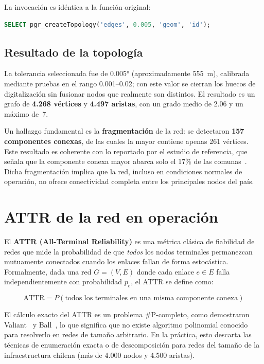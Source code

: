 \documentclass[12pt,a4paper]{article}
\begin{document}
La invocación es idéntica a la función original:

\begin{lstlisting}[language=SQL,caption={Invocación de pgr\_createTopology}]
SELECT pgr_createTopology('edges', 0.005, 'geom', 'id');
\end{lstlisting}

\subsection{Resultado de la topología}

La tolerancia seleccionada fue de 0.005° (aproximadamente 555~m),
calibrada mediante pruebas en el rango 0.001--0.02; con este valor se
cierran los huecos de digitalización sin fusionar nodos que realmente son
distintos.  El resultado es un grafo de \textbf{4.268 vértices} y
\textbf{4.497 aristas}, con un grado medio de 2.06 y un máximo de~7.

Un hallazgo fundamental es la \textbf{fragmentación} de la red: se
detectaron \textbf{157 componentes conexas}, de las cuales la mayor
contiene apenas 261 vértices.  Este resultado es coherente con lo reportado
por el estudio de referencia, que señala que la componente conexa mayor
abarca solo el 17\% de las comunas~\cite{niclabs2018}.  Dicha fragmentación
implica que la red, incluso en condiciones normales de operación, no ofrece
conectividad completa entre los principales nodos del país.


\section{ATTR de la red en operación}

El \textbf{ATTR (All-Terminal Reliability)} es una métrica clásica de
fiabilidad de redes que mide la probabilidad de que \textit{todos} los
nodos terminales permanezcan mutuamente conectados cuando los enlaces
fallan de forma estocástica.  Formalmente, dada una red $G=(V,E)$ donde
cada enlace $e \in E$ falla independientemente con probabilidad
$p_e$, el ATTR se define como:

\begin{equation}
\text{ATTR} = P\!\left(\text{todos los terminales en una misma componente conexa}\right)
\end{equation}

El cálculo exacto del ATTR es un problema \#P-completo, como demostraron
Valiant~\cite{valiant1979} y Ball~\cite{ball1986}, lo que significa que no
existe algoritmo polinomial conocido para resolverlo en redes de tamaño
arbitrario.  En la práctica, esto descarta las técnicas de enumeración
exacta o de descomposición para redes del tamaño de la infraestructura
chilena (más de 4.000 nodos y 4.500 aristas).
\end{document}
